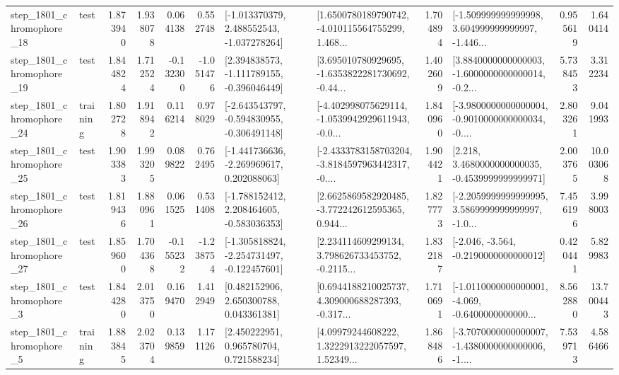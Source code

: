 \begin{tabular}{llrrrrllrlrr}
 step\_1801\_chromophore\_18 &      test &      1.873940 &    1.938078 &      0.064138 &  0.552748 &   [-1.013370379, 2.488552543, -1.037278264] &  [1.6500780189790742, -4.010115564755299, 1.468... &       1.704894 &  [-1.509999999999998, 3.604999999999997, -1.446... &            0.955619 &          1.640414 \\
 step\_1801\_chromophore\_19 &      test &      1.844824 &    1.712524 &     -0.132300 & -1.051476 &   [2.394838573, -1.111789155, -0.396046449] &  [3.695010780929695, -1.6353822281730692, -0.44... &       1.402609 &  [3.8840000000000003, -1.6000000000000014, -0.2... &            5.738453 &          3.312234 \\
 step\_1801\_chromophore\_24 &  training &      1.802728 &    1.918942 &      0.116214 &  0.978029 &  [-2.643543797, -0.594830955, -0.306491148] &  [-4.402998075629114, -1.0539942929611943, -0.0... &       1.840960 &  [-3.9800000000000004, -0.9010000000000034, -0.... &            2.803261 &          9.041993 \\
 step\_1801\_chromophore\_25 &      test &      1.903383 &    1.993205 &      0.089822 &  0.762495 &   [-1.441736636, -2.269969617, 0.202088063] &  [-2.4333783158703204, -3.8184597963442317, -0.... &       1.904421 &   [2.218, 3.4680000000000035, -0.4539999999999971] &            2.003765 &         10.003068 \\
 step\_1801\_chromophore\_26 &      test &      1.819436 &    1.880961 &      0.061525 &  0.531408 &   [-1.788152412, 2.208464605, -0.583036353] &  [2.6625869582920485, -3.772242612595365, 0.944... &       1.827773 &  [-2.2059999999999995, 3.5869999999999997, -1.0... &            7.456196 &          3.998003 \\
 step\_1801\_chromophore\_27 &      test &      1.859600 &    1.704368 &     -0.155232 & -1.238754 &  [-1.305818824, -2.254731497, -0.122457601] &  [2.234114609299134, 3.798626733453752, -0.2115... &       1.832187 &              [-2.046, -3.564, -0.2190000000000012] &            0.420441 &          5.829983 \\
  step\_1801\_chromophore\_3 &      test &      1.844280 &    2.013750 &      0.169470 &  1.412949 &     [0.482152906, 2.650300788, 0.043361381] &  [0.6944188210025737, 4.309000688287393, -0.317... &       1.710691 &  [-1.0110000000000001, -4.069, -0.6400000000000... &            8.562880 &         13.700443 \\
  step\_1801\_chromophore\_5 &  training &      1.883845 &    2.023704 &      0.139859 &  1.171126 &     [2.450222951, 0.965780704, 0.721588234] &  [4.09979244608222, 1.3222913222057597, 1.52349... &       1.868486 &  [-3.7070000000000007, -1.4380000000000006, -1.... &            7.539713 &          4.586466 \\

\end{tabular}
